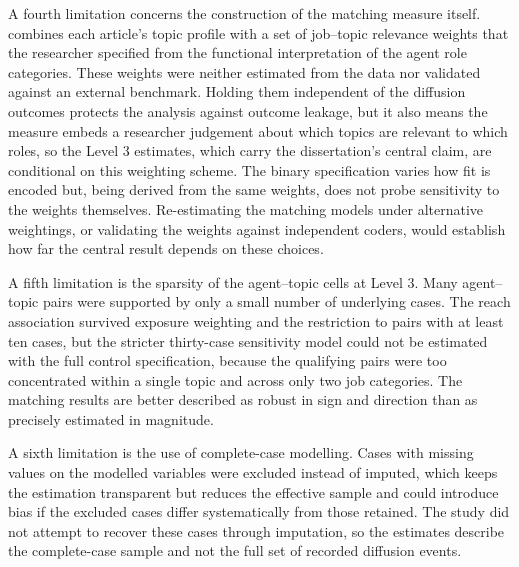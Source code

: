 A fourth limitation concerns the construction of the matching measure itself.  combines each article's topic profile with a set of job–topic relevance weights that the researcher specified from the functional interpretation of the agent role categories. These weights were neither estimated from the data nor validated against an external benchmark. Holding them independent of the diffusion outcomes protects the analysis against outcome leakage, but it also means the measure embeds a researcher judgement about which topics are relevant to which roles, so the Level 3 estimates, which carry the dissertation's central claim, are conditional on this weighting scheme. The binary  specification varies how fit is encoded but, being derived from the same weights, does not probe sensitivity to the weights themselves. Re-estimating the matching models under alternative weightings, or validating the weights against independent coders, would establish how far the central result depends on these choices.

A fifth limitation is the sparsity of the agent–topic cells at Level 3. Many agent–topic pairs were supported by only a small number of underlying cases. The reach association survived exposure weighting and the restriction to pairs with at least ten cases, but the stricter thirty-case sensitivity model could not be estimated with the full control specification, because the qualifying pairs were too concentrated within a single topic and across only two job categories. The matching results are better described as robust in sign and direction than as precisely estimated in magnitude.

A sixth limitation is the use of complete-case modelling. Cases with missing values on the modelled variables were excluded instead of imputed, which keeps the estimation transparent but reduces the effective sample and could introduce bias if the excluded cases differ systematically from those retained. The study did not attempt to recover these cases through imputation, so the estimates describe the complete-case sample and not the full set of recorded diffusion events.

